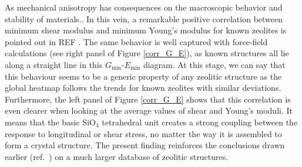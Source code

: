 \documentclass[journal=jacsat,manuscript=article]{achemso}
\newcommand\e[1]{\ensuremath{_{\text{#1}}}}
\begin{document}
As mechanical anisotropy has consequences on the macroscopic behavior and stability of materials.\cite{Tan2010, Varughese2013}. In this vein, a remarkable positive correlation between minimum shear modulus and minimum Young's modulus for known zeolites is pointed out in REF . The same behavior is well captured with force-field calculations (see right panel of Figure \ref{corr_G_E}), as known structures all lie along a straight line in this $G$\e{min}-$E$\e{min} diagram. At this stage, we can say that this behaviour seems to be a generic property of any zeolitic structure as the global heatmap follows the trends for known zeolites with similar deviations. Furthermore, the left panel of Figure \ref{corr_G_E} shows that this correlation is even clearer when looking at the average values of shear and Young's moduli. It means that the basic SiO\e{4} tetrahedral unit creates a strong coupling between the response to longitudinal or shear stress, no matter the way it is assembled to form a crystal structure. The present finding reinforces the conclusions drawn earlier (ref.~) on a much larger database of zeolitic structures.
		
\end{document}
